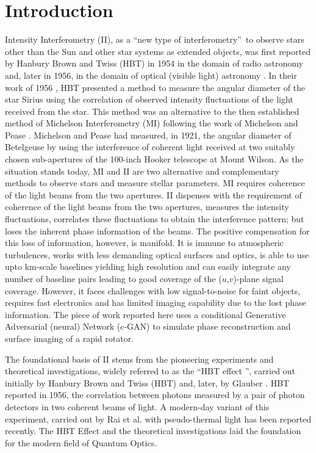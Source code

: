\section{Introduction}
Intensity Interferometry (II), as a \textquotedblleft new type of interferometry\textquotedblright\ to observe stars other than the Sun and other star systems as extended objects, was first reported by Hanbury Brown and Twiss (HBT) in 1954 \citep{brown1954lxxiv} in the domain of radio astronomy and, later in 1956, in the domain of optical  (visible light) astronomy \citep{HBT56Sirius}. In their work of 1956 \citep{HBT56Sirius}, HBT presented a method to measure the angular diameter of the star Sirius using the correlation of observed intensity fluctuations of the light received from the star. This method was an alternative to the then established method of Michelson Interferometry (MI) following the work of Michelson and Pease \citep{MichelsonPease1921}. Michelson and Pease had measured, in 1921, the angular diameter of Betelgeuse by using the interference of coherent light received at two suitably chosen sub-apertures of the 100-inch Hooker telescope at Mount Wilson. As the situation stands today, MI and II are two alternative and complementary methods to observe stars and measure stellar parameters. MI requires coherence of the light beams from the two apertures. II dispenses with the requirement of coherence of the light beams from the two apertures, measures the intensity fluctuations, correlates these fluctuations to obtain the interference pattern; but loses the inherent phase information of the beams. The positive compensation for this loss of information, however, is manifold. It is immune to atmospheric turbulences, works with less demanding optical surfaces and optics, is able to use upto km-scale baselines yielding high resolution and can easily integrate any number of baseline pairs leading to good coverage of the ($u$,$v$)-plane signal coverage. However, it faces challenges with low signal-to-noise for faint objects, requires fast electronics and has limited imaging capability due to the lost phase information. The piece of work reported here uses a conditional Generative Adversarial (neural) Network (c-GAN) to simulate phase reconstruction and surface imaging of a rapid rotator.

The foundational basis of II stems from the pioneering experiments and theoretical investigations, widely referred to as the \textquotedblleft HBT effect \textquotedblright, carried out initially by Hanbury Brown and Twiss (HBT) \cite{HBT56Lab,brown1957interferometry, brown1958interferometry} and, later, by Glauber \citep{glauber1963quantum}. HBT reported \cite{HBT56Lab} in 1956, the correlation between photons measured by a pair of photon detectors in two coherent beams of light. A modern-day variant of this experiment, carried out by Rai et al. \cite{Rai2025} with pseudo-thermal light has been reported recently. The HBT Effect and the theoretical investigations laid the foundation for the modern field of Quantum Optics.


